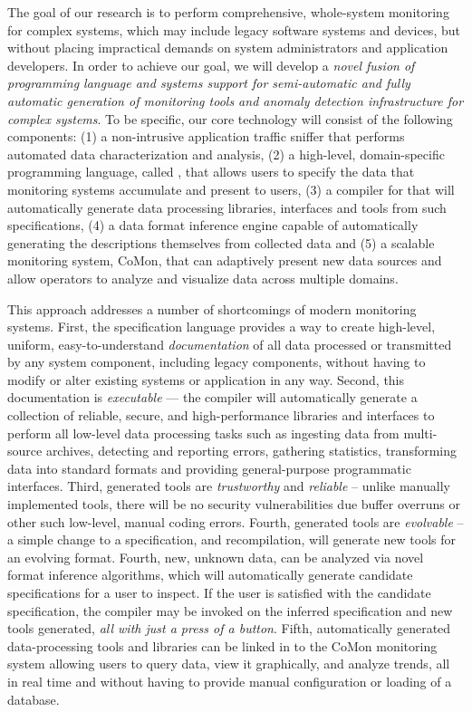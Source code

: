 The goal of our research is to perform comprehensive, whole-system
monitoring for complex systems, which may include legacy software
systems and devices, but without placing impractical demands on system
administrators and application developers.  In order to achieve our
goal, we will develop a {\em novel fusion of programming language and
systems support for semi-automatic and fully
automatic generation of monitoring tools and anomaly detection
infrastructure for complex systems}.  To be specific, our core technology will consist of
the following components: (1) a non-intrusive application traffic
sniffer that performs automated data characterization and analysis,
(2) a high-level, domain-specific programming language, called
\pads{}, that allows users to specify the data that monitoring systems
accumulate and present to users, (3) a compiler for \pads{} that will
automatically generate data processing libraries, interfaces and tools
from such specifications, (4) a data format inference engine capable
of automatically generating the \pads{} descriptions themselves from
collected data and (5) a scalable monitoring system, CoMon, that can
adaptively present new data sources and allow operators to analyze and
visualize data across multiple domains.

This approach addresses a number of shortcomings of modern monitoring
systems.  First, the \pads{} specification language provides a 
way to create high-level, uniform, easy-to-understand {\em documentation}
of all data processed or transmitted by any system component, 
including legacy components, without having to modify or alter existing
systems or
application in any way.  Second, this documentation is 
{\em executable} --- the
\pads{} compiler will automatically generate a collection of
reliable, secure, and high-performance libraries and interfaces
to perform all low-level data processing tasks such as ingesting
data from multi-source archives, detecting and reporting
errors, gathering statistics, 
transforming data into standard formats and providing
general-purpose programmatic interfaces.  Third, generated
tools are {\em trustworthy} and {\em reliable} -- unlike manually 
implemented tools, there will be no security vulnerabilities due
buffer overruns or other such low-level, manual coding errors.
Fourth, generated tools are {\em evolvable} -- a simple change to
a specification, and recompilation, will generate new tools for
an evolving format.  Fourth, new, unknown data, can be analyzed
via novel format inference algorithms, which will automatically generate
candidate specifications for a user to inspect.  If the user
is satisfied with the candidate specification, the \pads{} compiler
may be invoked on the inferred specification and new tools generated,
{\em all with just a press of a button}.
Fifth, automatically generated data-processing tools and libraries 
can be linked in to the CoMon monitoring
system allowing users to query
data, view it graphically, and analyze trends, all in real
time and without having
to provide manual configuration or loading of a database.

